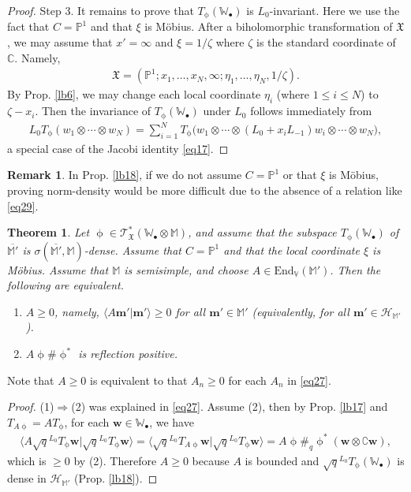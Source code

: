 \documentclass[11pt,b5paper,notitlepage]{article}
\theoremstyle{definition}
\newtheorem{rem}[df]{Remark}
\theoremstyle{plain}
\newtheorem{thm}[df]{Theorem}
\newcommand{\fk}{\mathfrak}
\newcommand{\mc}{\mathcal}
\newcommand{\ovl}{\overline}
\newcommand{\End}{\mathrm{End}} %
\newcommand{\bk}[1]{\langle {#1}\rangle}
\newcommand{\scr}{\mathscr}
\newcommand{\Co}{\complement}
\newcommand{\mbf}{\mathbf}
\newcommand{\blt}{\bullet}
\newcommand{\Vbb}{\mathbb V}
\newcommand{\Wbb}{\mathbb W}
\newcommand{\Mbb}{\mathbb M}
\newcommand{\Cbb}{\mathbb C}
\newcommand{\Pbb}{\mathbb P}
\newcommand{\wbf}{\mathbf w}
\numberwithin{equation}{section}
\begin{document}
\begin{proof}
Step 3. It remains to prove that $T_\upphi(\Wbb_\blt)$ is $L_0$-invariant. Here we use the fact that $C=\Pbb^1$ and that $\xi$ is M\"obius. After a biholomorphic transformation of $\fk X$, we may assume that $x'=\infty$ and $\xi=1/\zeta$ where $\zeta$ is the standard coordinate of $\Cbb$. Namely,
\begin{align*}
\fk X=(\Pbb^1;x_1,\dots,x_N,\infty;\eta_1,\dots,\eta_N,1/\zeta).
\end{align*}
By Prop. \ref{lb6}, we may change each local coordinate $\eta_i$ (where $1\leq i\leq N$) to $\zeta-x_i$. Then the invariance of $T_\upphi(\Wbb_\blt)$ under $L_0$ follows immediately from
\begin{align}\label{eq29}
L_0T_\upphi(w_1\otimes\cdots\otimes w_N)=\sum_{i=1}^N T_\upphi\big(w_1\otimes\cdots\otimes (L_0+x_i L_{-1})w_i\otimes\cdots\otimes w_N\big),
\end{align}
a special case of the Jacobi identity \eqref{eq17}.
\end{proof}


\begin{rem}
In Prop. \ref{lb18}, if we do not assume $C=\Pbb^1$ or that $\xi$ is M\"obius,  proving norm-density would be more difficult due to the absence of a relation like  \eqref{eq29}.
\end{rem}




\begin{thm}\label{lb45}
Let $\upphi\in\scr T_{\fk X}^*(\Wbb_\blt\otimes\Mbb)$, and assume that the subspace $T_\upphi(\Wbb_\blt)$ of $\ovl{\Mbb'}$ is $\sigma(\ovl{\Mbb'},\Mbb)$-dense. Assume that $C=\Pbb^1$ and that the local coordinate $\xi$ is M\"obius. Assume that $\Mbb$ is semisimple, and choose $A\in\End_\Vbb(\Mbb')$. Then the following are equivalent.
\begin{enumerate}[label=(\arabic*)]
\item $A\geq 0$, namely, $\bk{A\mbf m'|\mbf m'}\geq0$ for all $\mbf m'\in\Mbb'$ (equivalently, for all $\mbf m'\in\mc H_{\Mbb'}$).
\item $A\upphi\#\upphi^*$ is reflection positive.
\end{enumerate}
\end{thm}

Note that $A\geq 0$ is equivalent to that $A_n\geq 0$ for each $A_n$ in \eqref{eq27}.

\begin{proof}
(1)$\Rightarrow$(2) was explained in \eqref{eq27}. Assume (2), then by Prop. \ref{lb17} and $T_{A\upphi}=AT_\upphi$, for each $\wbf\in\Wbb_\blt$, we have
\begin{align*}
\bk{A\sqrt q^{L_0}T_\upphi \wbf|\sqrt q^{L_0}T_\upphi\wbf}=\bk{\sqrt q^{L_0}T_{A\upphi}\wbf|\sqrt q^{L_0}T_\upphi\wbf}=A\upphi\#_q\upphi^*(\wbf\otimes\Co\wbf),
\end{align*}
which is $\geq0$ by (2). Therefore $A\geq0$ because $A$ is bounded and $\sqrt q^{L_0}T_\upphi(\Wbb_\blt)$ is dense in $\mc H_{\Mbb'}$ (Prop. \ref{lb18}).
\end{proof}
\end{document}
